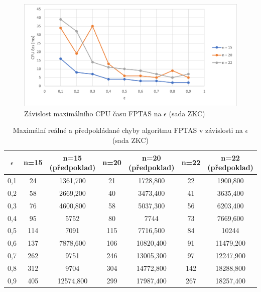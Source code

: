 \documentclass[12pt]{article}
\begin{document}
\begin{figure}[ht]\centering
    \includegraphics[width=1\textwidth, keepaspectratio]{graphs/ZKC/fptas/zkc_fptas_time_eps_max.png}
    \caption{Závislost maximálního CPU času FPTAS na $\epsilon$ (sada ZKC)}
    \label{fig:zkc_fptas_eps_time_max}
\end{figure}

\begin{table}
    \begin{center}
         \begin{tabular}{|c | c | c | c | c | c | c|} 
         \hline
         $\epsilon$ & n=15 & n=15 (předpoklad) & n=20 & n=20 (předpoklad) & n=22 & n=22 (předpoklad) \\ [0.1ex] 
         \hline\hline
        0,1 & 24 & 1361,700 & 21 & 1728,800 & 22 & 1900,800 \\
        \hline
        0,2 & 58 & 2669,200 & 40 & 3473,400 & 41 & 3635,400 \\
        \hline
        0,3 & 76 & 4600,800 & 58 & 5037,300 & 56 & 6203,400 \\
        \hline
        0,4 & 95 & 5752 & 80 & 7744 & 73 & 7669,600 \\
        \hline
        0,5 & 114 & 7091 & 115 & 7716,500 & 84 & 10244 \\
        \hline
        0,6 & 137 & 7878,600 & 106 & 10820,400 & 91 & 11479,200 \\
        \hline
        0,7 & 262 & 9751 & 246 & 13005,300 & 97 & 12247,900 \\
        \hline
        0,8 & 312 & 9704 & 304 & 14772,800 & 142 & 18288,800 \\
        \hline
        0,9 & 405 & 12574,800 & 299 & 17987,400 & 267 & 18257,400 \\
        \hline
        \end{tabular}
        \caption{Maximální reálné a předpokládané chyby algoritmu FPTAS v závislosti na $\epsilon$ (sada ZKC)} \label{tab:zkc_fptas_eps_error}
    \end{center}
\end{table}
\end{document}
